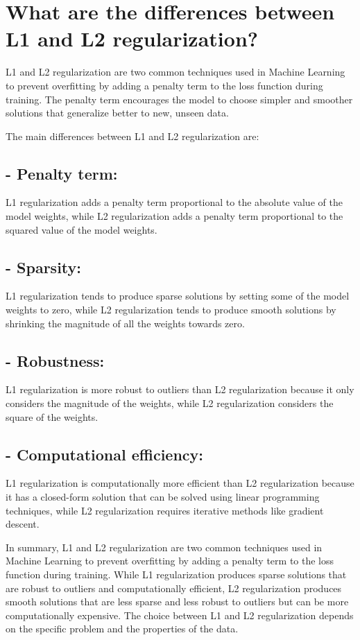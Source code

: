 \section{What are the differences between L1 and L2 regularization?}
L1 and L2 regularization are two common techniques used in Machine Learning to prevent overfitting by adding a penalty term to the loss function during training. The penalty term encourages the model to choose simpler and smoother solutions that generalize better to new, unseen data.

The main differences between L1 and L2 regularization are:

\subsection{- Penalty term:}  L1 regularization adds a penalty term proportional to the absolute value of the model weights, while L2 regularization adds a penalty term proportional to the squared value of the model weights.

\subsection{- Sparsity:}  L1 regularization tends to produce sparse solutions by setting some of the model weights to zero, while L2 regularization tends to produce smooth solutions by shrinking the magnitude of all the weights towards zero.

\subsection{- Robustness:}  L1 regularization is more robust to outliers than L2 regularization because it only considers the magnitude of the weights, while L2 regularization considers the square of the weights.

\subsection{- Computational efficiency:}  L1 regularization is computationally more efficient than L2 regularization because it has a closed-form solution that can be solved using linear programming techniques, while L2 regularization requires iterative methods like gradient descent.

In summary, L1 and L2 regularization are two common techniques used in Machine Learning to prevent overfitting by adding a penalty term to the loss function during training. While L1 regularization produces sparse solutions that are robust to outliers and computationally efficient, L2 regularization produces smooth solutions that are less sparse and less robust to outliers but can be more computationally expensive. The choice between L1 and L2 regularization depends on the specific problem and the properties of the data.


